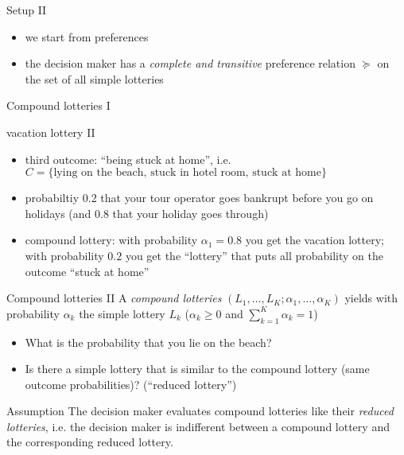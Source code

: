 \documentclass[bigger]{beamer}
\begin{document}
\begin{frame}[label={sec:org504af95}]{Setup II}
\begin{itemize}
\item we start from preferences
\item the decision maker has a \emph{complete and transitive} preference relation \(\succeq\)  on the set of all simple lotteries
\end{itemize}
\end{frame}
\begin{frame}[label={sec:org01e3031}]{Compound lotteries I}
\begin{block}{vacation lottery II}
\begin{itemize}
\item third outcome: ``being stuck at home'', i.e.  \(C=\{\text{lying on the beach, stuck in hotel room, stuck at home}\}\)
\item probabiltiy 0.2 that your tour operator goes bankrupt before you go on holidays (and 0.8 that your holiday goes through)
\item compound lottery:  with probability \(\alpha_1=0.8\) you get the vacation lottery; with probability \(0.2\) you get the ``lottery'' that puts all probability on the outcome ``stuck at home''
\end{itemize}
\end{block}
\end{frame}
\begin{frame}[label={sec:org8f59834}]{Compound lotteries II}
A \emph{compound lotteries} \((L_1,\dots,L_K;\alpha_1,\dots,\alpha_K)\) yields with probability \(\alpha_k\) the simple lottery \(L_k\) (\(\alpha_k\geq 0\) and \(\sum_{k=1}^{K} \alpha_k=1\))


\begin{itemize}
\item What is the probability that you lie on the beach?
\item Is there a simple lottery that is similar to the compound lottery (same outcome probabilities)? (``reduced lottery'')
\end{itemize}


\begin{block}{Assumption}
The decision maker evaluates compound lotteries like their \emph{reduced lotteries}, i.e. the decision maker is indifferent between a compound lottery and the corresponding reduced lottery.
\end{block}
\end{frame}
\end{document}
